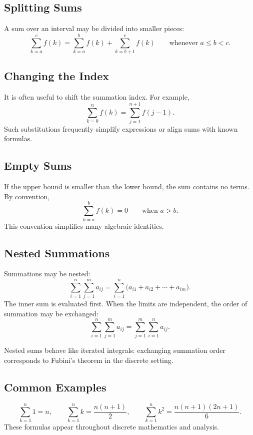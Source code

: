 \subsection*{Splitting Sums}

\begin{remark*}[Interpretation]
A sum over an interval may be divided into smaller pieces:
\[
\sum_{k=a}^{c} f(k)
=
\sum_{k=a}^{b} f(k)
+
\sum_{k=b+1}^{c} f(k)
\qquad \text{whenever } a \le b < c.
\]
\end{remark*}

\subsection*{Changing the Index}

\begin{remark*}[Interpretation]
It is often useful to shift the summation index. For example,
\[
\sum_{k=0}^{n} f(k) = \sum_{j=1}^{n+1} f(j-1).
\]
Such substitutions frequently simplify expressions or align sums
with known formulas.
\end{remark*}

\subsection*{Empty Sums}

\begin{remark*}[Interpretation]
If the upper bound is smaller than the lower bound, the sum contains
no terms. By convention,
\[
\sum_{k=a}^{b} f(k) = 0 \qquad \text{when } a > b.
\]
This convention simplifies many algebraic identities.
\end{remark*}

\subsection*{Nested Summations}

\begin{remark*}[Interpretation]
Summations may be nested:
\[
\sum_{i=1}^{n} \sum_{j=1}^{m} a_{ij}
= \sum_{i=1}^{n}\bigl(a_{i1} + a_{i2} + \cdots + a_{im}\bigr).
\]
The inner sum is evaluated first. When the limits are independent,
the order of summation may be exchanged:
\[
\sum_{i=1}^{n}\sum_{j=1}^{m} a_{ij}
=
\sum_{j=1}^{m}\sum_{i=1}^{n} a_{ij}.
\]
\end{remark*}

\begin{remark*}[Interpretation]
Nested sums behave like iterated integrals: exchanging summation order
corresponds to Fubini's theorem in the discrete setting.
\end{remark*}

\subsection*{Common Examples}

\begin{remark*}[Interpretation]
\[
\sum_{k=1}^{n} 1 = n, \qquad
\sum_{k=1}^{n} k = \frac{n(n+1)}{2}, \qquad
\sum_{k=1}^{n} k^2 = \frac{n(n+1)(2n+1)}{6}.
\]
These formulas appear throughout discrete mathematics and analysis.
\end{remark*}
